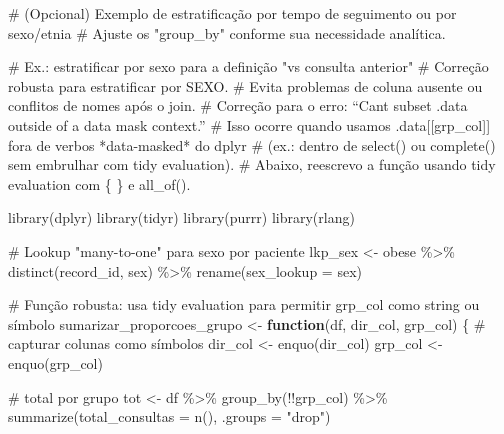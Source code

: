 \documentclass[
]{article}
\newenvironment{Shaded}{\begin{snugshade}}{\end{snugshade}}
\newcommand{\AttributeTok}[1]{\textcolor[rgb]{0.40,0.45,0.13}{#1}}
\newcommand{\CommentTok}[1]{\textcolor[rgb]{0.37,0.37,0.37}{#1}}
\newcommand{\ControlFlowTok}[1]{\textcolor[rgb]{0.00,0.23,0.31}{\textbf{#1}}}
\newcommand{\FunctionTok}[1]{\textcolor[rgb]{0.28,0.35,0.67}{#1}}
\newcommand{\NormalTok}[1]{\textcolor[rgb]{0.00,0.23,0.31}{#1}}
\newcommand{\OtherTok}[1]{\textcolor[rgb]{0.00,0.23,0.31}{#1}}
\newcommand{\SpecialCharTok}[1]{\textcolor[rgb]{0.37,0.37,0.37}{#1}}
\newcommand{\StringTok}[1]{\textcolor[rgb]{0.13,0.47,0.30}{#1}}
\begin{document}
\begin{Shaded}
\begin{Highlighting}[]
\CommentTok{\# (Opcional) Exemplo de estratificação por tempo de seguimento ou por sexo/etnia}
\CommentTok{\# Ajuste os "group\_by" conforme sua necessidade analítica.}

\CommentTok{\# Ex.: estratificar por sexo para a definição "vs consulta anterior"}
\CommentTok{\# Correção robusta para estratificar por SEXO.}
\CommentTok{\# Evita problemas de coluna ausente ou conflitos de nomes após o join.}
\CommentTok{\# Correção para o erro: “Can\textquotesingle{}t subset \textasciigrave{}.data\textasciigrave{} outside of a data mask context.”}
\CommentTok{\# Isso ocorre quando usamos \textasciigrave{}.data[[grp\_col]]\textasciigrave{} fora de verbos *data{-}masked* do dplyr}
\CommentTok{\# (ex.: dentro de \textasciigrave{}select()\textasciigrave{} ou \textasciigrave{}complete()\textasciigrave{} sem embrulhar com tidy evaluation).}
\CommentTok{\# Abaixo, reescrevo a função usando tidy evaluation com \textasciigrave{}\{ \}\textasciigrave{} e \textasciigrave{}all\_of()\textasciigrave{}.}

\FunctionTok{library}\NormalTok{(dplyr)}
\FunctionTok{library}\NormalTok{(tidyr)}
\FunctionTok{library}\NormalTok{(purrr)}
\FunctionTok{library}\NormalTok{(rlang)}

\CommentTok{\# Lookup "many{-}to{-}one" para sexo por paciente}
\NormalTok{lkp\_sex }\OtherTok{\textless{}{-}}\NormalTok{ obese }\SpecialCharTok{\%\textgreater{}\%}
  \FunctionTok{distinct}\NormalTok{(record\_id, sex) }\SpecialCharTok{\%\textgreater{}\%}
  \FunctionTok{rename}\NormalTok{(}\AttributeTok{sex\_lookup =}\NormalTok{ sex)}

\CommentTok{\# Função robusta: usa tidy evaluation para permitir \textasciigrave{}grp\_col\textasciigrave{} como string ou símbolo}
\NormalTok{sumarizar\_proporcoes\_grupo }\OtherTok{\textless{}{-}} \ControlFlowTok{function}\NormalTok{(df, dir\_col, grp\_col) \{}
  \CommentTok{\# capturar colunas como símbolos}
\NormalTok{  dir\_col }\OtherTok{\textless{}{-}} \FunctionTok{enquo}\NormalTok{(dir\_col)}
\NormalTok{  grp\_col }\OtherTok{\textless{}{-}} \FunctionTok{enquo}\NormalTok{(grp\_col)}

  \CommentTok{\# total por grupo}
\NormalTok{  tot }\OtherTok{\textless{}{-}}\NormalTok{ df }\SpecialCharTok{\%\textgreater{}\%}
    \FunctionTok{group\_by}\NormalTok{(}\SpecialCharTok{!!}\NormalTok{grp\_col) }\SpecialCharTok{\%\textgreater{}\%}
    \FunctionTok{summarize}\NormalTok{(}\AttributeTok{total\_consultas =} \FunctionTok{n}\NormalTok{(), }\AttributeTok{.groups =} \StringTok{"drop"}\NormalTok{)}


\end{Highlighting}
\end{Shaded}
\end{document}
